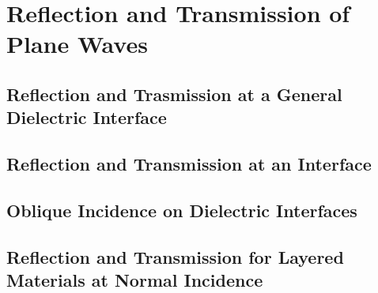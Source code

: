 \section{Reflection and Transmission of Plane Waves}

\subsection{Reflection and Trasmission at a General Dielectric Interface}

\subsection{Reflection and Transmission at an Interface}

\subsection{Oblique Incidence on Dielectric Interfaces}

\subsection{Reflection and Transmission for Layered Materials at Normal Incidence}
